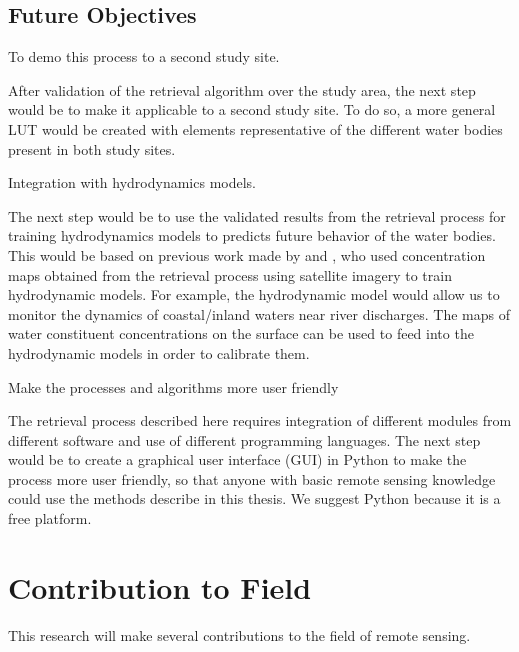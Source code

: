 \subsection{Future Objectives}
	\begin{enumerate}

		{\bf \item To demo this process to a second study site.}

After validation of the retrieval algorithm over the study area, the next step would be to make it applicable to a second study site. To do so, a more general LUT would be created with elements representative of the different water bodies present in both study sites.

			{\bf \item Integration with hydrodynamics models.} 

The next step would be to use the validated results from the retrieval process for training hydrodynamics models to predicts future behavior of the water bodies. This would be based on previous work made by \cite{Pahlevan:2012} and \cite{GeraceThesis}, who used concentration maps obtained from the retrieval process using satellite imagery to train hydrodynamic models. For example, the hydrodynamic model would allow us to monitor the dynamics of coastal/inland waters near river discharges. The maps of water constituent concentrations on the surface can be used to feed into the hydrodynamic models in order to calibrate them. 

			{\bf \item Make the processes and algorithms more user friendly} 

The retrieval process described here requires integration of different modules from different software and use of different programming languages. The next step would be to create a graphical user interface (GUI) in Python to make the process more user friendly, so that anyone with basic remote sensing knowledge could use the methods describe in this thesis. We suggest Python because it is a free platform.

	\end{enumerate}	

		

\section{Contribution to Field}
\label{sec:contributiontofield}
This research will make several contributions to the field of remote sensing.

